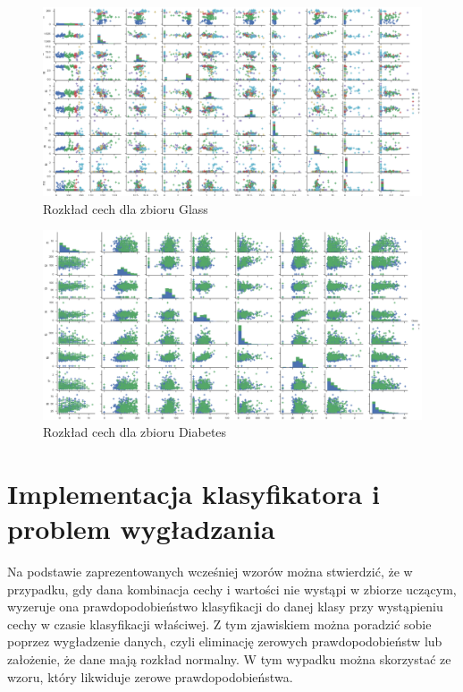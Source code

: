 \documentclass[12pt,a4paper]{article}
\begin{document}
\begin{figure}[H]
\centering
\includegraphics[width=1\textwidth]{dsGlassCombined.png}
\caption{Rozkład cech dla zbioru Glass}
\end{figure}

\begin{figure}[H]
\centering
\includegraphics[width=1\textwidth]{dsDiabetesCombined.png}
\caption{Rozkład cech dla zbioru Diabetes}
\end{figure}




\section{Implementacja klasyfikatora i problem wygładzania}

Na podstawie zaprezentowanych wcześniej wzorów można stwierdzić, że w przypadku, gdy dana kombinacja cechy  i wartości nie wystąpi w zbiorze uczącym, wyzeruje ona prawdopodobieństwo klasyfikacji do danej klasy przy wystąpieniu cechy w czasie klasyfikacji właściwej. Z tym zjawiskiem można poradzić sobie poprzez wygładzenie danych, czyli eliminację zerowych prawdopodobieństw lub założenie, że dane mają rozkład normalny. W tym wypadku można skorzystać ze wzoru, który likwiduje zerowe prawdopodobieństwa.
\end{document}
